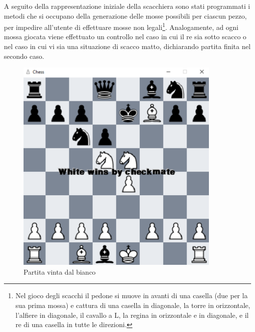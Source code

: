 \newpage

A seguito della rappresentazione iniziale della scacchiera sono stati programmati i metodi che si occupano della generazione delle mosse possibili per ciascun pezzo, per impedire all'utente di effettuare mosse non legali\footnote{Nel gioco degli scacchi il pedone si muove in avanti di una casella (due per la sua prima mossa) e cattura di una casella in diagonale, la torre in orizzontale, l'alfiere in diagonale, il cavallo a L, la regina in orizzontale e in diagonale, e il re di una casella in tutte le direzioni.}. Analogamente, ad ogni mossa giocata viene effettuato un controllo nel caso in cui il re sia sotto scacco o nel caso in cui vi sia una situazione di scacco matto, dichiarando partita finita nel secondo caso.
\begin{figure}[!htb]
    \includegraphics[width=10cm]{frontmatter/figure/checkmate.pdf}
    \centering
    \caption{Partita vinta dal bianco}
    \label{fig:checkmate}
\end{figure}
